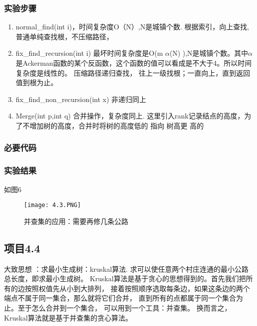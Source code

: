 \subsubsection{实验步骤}
\begin{enumerate}
\item normal\_find(int i)，时间复杂度O（N）,N是城镇个数.       根据索引，向上查找,普通单纯查找根，不压缩路径，
\item fix\_find\_recursion(int i) 最坏时间复杂度是O(m $\alpha$(N) ),N是城镇个数。其中$\alpha$是Ackerman函数的某个反函数，这个函数的值可以看成是不大于4。所以时间复杂度是线性的。           压缩路径递归查找， 往上一级找根；一直向上，直到返回值到根为止。
\item fix\_find\_non\_recursion(int x)  非递归同上
\item Merge(int p,int q) 合并操作，复杂度同上.             这里引入rank记录结点的高度，为了不增加树的高度，合并时将树的高度低的 指向 树高更 高的
\end{enumerate}
\subsubsection{必要代码}


\subsubsection{实验结果}如图6
	\begin{figure}[!bthp]
	\centering
        \texttt{[image: 4.3.PNG]}
        \caption{并查集的应用：需要再修几条公路}
      \end{figure}

\subsection{项目4.4}
大致思想 ：求最小生成树：kruskal算法. 求可以使任意两个村庄连通的最小公路总长度，即求最小生成树。
 Kruskal算法是基于贪心的思想得到的。首先我们把所有的边按照权值先从小到大排列，
 接着按照顺序选取每条边，如果这条边的两个端点不属于同一集合，那么就将它们合并，
 直到所有的点都属于同一个集合为止。至于怎么合并到一个集合，
 可以用到一个工具：并查集。
 换而言之，Kruskal算法就是基于并查集的贪心算法。

